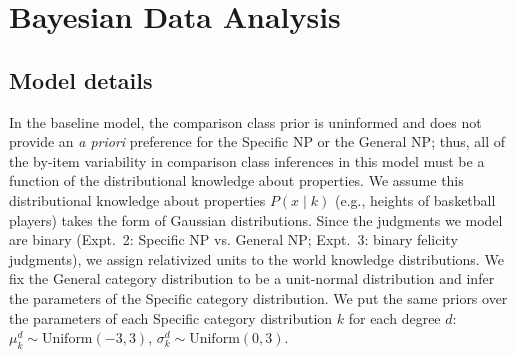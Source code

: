 \documentclass[doc]{apa6}
\begin{document}

\section{Bayesian Data Analysis}


\subsection{Model details}


In the baseline model, the comparison class prior is uninformed and does not provide an \emph{a priori} preference for the Specific NP or the General NP; thus, all of the by-item variability in comparison class inferences in this model must be a function of the distributional knowledge about properties.
We assume this distributional knowledge about properties $P(x \mid k)$ (e.g., heights of basketball players) takes the form of Gaussian distributions. Since the judgments we model are binary (Expt.~2: Specific NP vs. General NP; Expt.~3: binary felicity judgments), we assign relativized units to the world knowledge distributions. We fix the General category distribution to be a unit-normal distribution and infer the parameters of the Specific category distribution. 
We put the same priors over the parameters of each Specific category distribution $k$ for each degree $d$: $\mu^d_k \sim \text{Uniform}(-3, 3)$, $\sigma^d_k \sim \text{Uniform}(0, 3)$.
\end{document}
